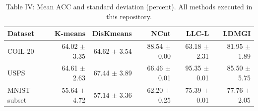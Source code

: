 \begin{table}[ht]
\centering
\caption{Table IV: Mean ACC and standard deviation (percent). All methods executed in this repository.}
\begin{tabular}{lrrrrr}
\toprule
Dataset & K-means & DisKmeans & NCut & LLC-L & LDMGI \\
\midrule
COIL-20 & 64.02 $\pm$ 3.35 & 64.62 $\pm$ 3.54 & 88.54 $\pm$ 0.00 & 63.18 $\pm$ 2.31 & 81.95 $\pm$ 1.89 \\
USPS & 64.61 $\pm$ 2.63 & 67.44 $\pm$ 3.89 & 66.46 $\pm$ 0.01 & 95.35 $\pm$ 0.01 & 85.50 $\pm$ 5.75 \\
MNIST subset & 55.64 $\pm$ 4.72 & 57.14 $\pm$ 3.36 & 62.20 $\pm$ 0.25 & 75.39 $\pm$ 0.01 & 77.76 $\pm$ 2.05 \\
\bottomrule
\end{tabular}
\end{table}

